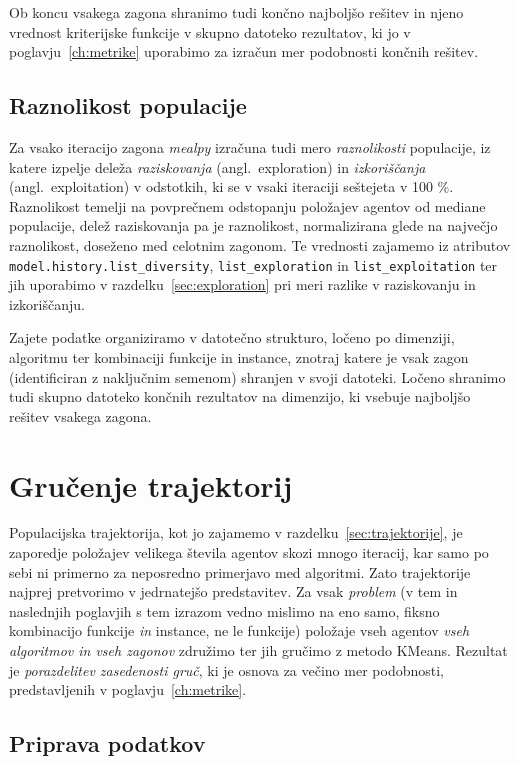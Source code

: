 \documentclass[a4paper, 12pt]{book}
\begin{document}
Ob koncu vsakega zagona shranimo tudi končno najboljšo rešitev in njeno
vrednost kriterijske funkcije v skupno datoteko rezultatov, ki jo v
poglavju~\ref{ch:metrike} uporabimo za izračun mer podobnosti končnih rešitev.

\subsection{Raznolikost populacije}

Za vsako iteracijo zagona \emph{mealpy} izračuna tudi mero \emph{raznolikosti}
populacije, iz katere izpelje deleža \emph{raziskovanja} (angl.\ exploration)
in \emph{izkoriščanja} (angl.\ exploitation) v odstotkih, ki se v vsaki
iteraciji seštejeta v 100 \%. Raznolikost temelji na povprečnem odstopanju
položajev agentov od mediane populacije, delež raziskovanja pa je raznolikost,
normalizirana glede na največjo raznolikost, doseženo med celotnim zagonom.
Te vrednosti zajamemo iz atributov \texttt{model.history.list\_diversity},
\texttt{list\_exploration} in \texttt{list\_exploitation} ter jih uporabimo v
razdelku~\ref{sec:exploration} pri meri razlike v raziskovanju in
izkoriščanju.

Zajete podatke organiziramo v datotečno strukturo, ločeno po dimenziji,
algoritmu ter kombinaciji funkcije in instance, znotraj katere je vsak zagon
(identificiran z naključnim semenom) shranjen v svoji datoteki. Ločeno
shranimo tudi skupno datoteko končnih rezultatov na dimenzijo, ki vsebuje
najboljšo rešitev vsakega zagona.

\section{Gručenje trajektorij}
\label{sec:grucenje}

Populacijska trajektorija, kot jo zajamemo v razdelku~\ref{sec:trajektorije},
je zaporedje po\-lo\-ža\-jev velikega števila agentov skozi mnogo iteracij, kar samo
po sebi ni primerno za neposredno primerjavo med algoritmi. Zato trajektorije
najprej pretvorimo v jedrnatejšo predstavitev. Za vsak \emph{problem} (v tem in naslednjih poglavjih s tem izrazom vedno mislimo na eno samo,
fiksno kombinacijo funkcije \emph{in} instance, ne le funkcije) položaje
vseh agentov \emph{vseh algoritmov in vseh zagonov} združimo ter jih gručimo z
metodo KMeans. Rezultat je \emph{porazdelitev zasedenosti gruč}, ki je osnova za večino
mer podobnosti, predstavljenih v poglavju~\ref{ch:metrike}.

\subsection{Priprava podatkov}
\end{document}

